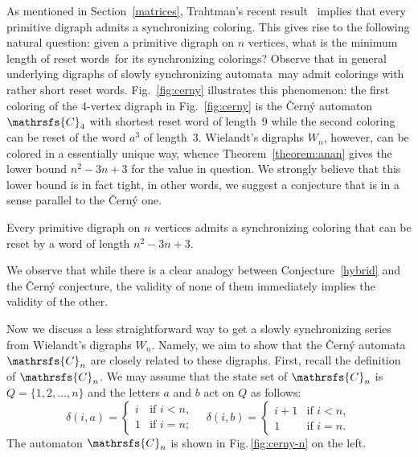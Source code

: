 \documentclass[11pt]{llncs}
\newcommand{\sa}{synchronizing automata}
\newcommand{\sws}{reset words}
\begin{document}
As mentioned in Section~\ref{matrices}, Trahtman's recent result~\cite{Tr09}
implies that every primitive digraph admits a synchronizing coloring. This
gives rise to the following natural question: given a primitive digraph on
$n$ vertices, what is the minimum length of \sws\ for its synchronizing
colorings? Observe that in general underlying digraphs of slowly \sa\ may
admit colorings with rather short \sws. Fig.~\ref{fig:cerny} illustrates
this phenomenon: the first coloring of the 4-vertex digraph in Fig.~\ref{fig:cerny}
is the \v{C}ern\'{y} automaton $\mathrsfs{C}_4$ with shortest reset word of
length~9 while the second coloring can be reset of the word $a^3$ of length~3.
Wielandt's digraphs $W_n$, however, can be colored in a essentially unique
way, whence Theorem~\ref{theorem:anan} gives the lower bound $n^2-3n+3$
for the value in question. We strongly believe that this lower bound is
in fact tight, in other words, we suggest a conjecture that is in a sense
parallel to the \v{C}ern\'{y} one.
\begin{conjecture}
\label{hybrid}
Every primitive digraph on $n$ vertices admits a synchronizing coloring
that can be reset by a word of length $n^2-3n+3$.
\end{conjecture}
We observe that while there is a clear analogy between Conjecture~\ref{hybrid}
and the \v{C}ern\'{y} conjecture, the validity of none of them immediately
implies the validity of the other.

Now we discuss a less straightforward way to get a slowly synchronizing series
from Wielandt's digraphs $W_n$. Namely, we aim to show that the \v{C}ern\'{y}
automata $\mathrsfs{C}_n$ are closely related to these digraphs. First, recall
the definition of $\mathrsfs{C}_n$. We may assume that the state set of
$\mathrsfs{C}_n$ is $Q=\{1,2,\dots,n\}$ and the letters $a$ and $b$ act
on $Q$ as follows:
$$\delta(i,a)=\begin{cases}
i &\text{if } i<n,\\
1 &\text{if } i=n;
\end{cases}\quad
\delta(i,b)=\begin{cases}
i+1 &\text{if } i<n,\\
1 &\text{if } i=n.
\end{cases}$$
The automaton $\mathrsfs{C}_n$ is shown in Fig.\,\ref{fig:cerny-n} on the left.
\end{document}
